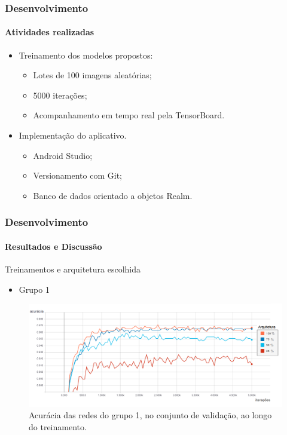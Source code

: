 \documentclass{beamer}
\begin{document}
    \begin{frame}[t]
      \frametitle{Desenvolvimento}
      \framesubtitle{Atividades realizadas}      
      \begin{itemize}
        \item<1-> Treinamento dos modelos propostos: \medskip
		 \begin{itemize}
        		\item<1-> Lotes de 100 imagens aleatórias; \medskip
        		\item<1-> 5000 iterações; \medskip
        		\item<1-> Acompanhamento em tempo real pela TensorBoard. \medskip
		\end{itemize}        
        \item<2-> Implementação do aplicativo.\medskip
        \begin{itemize}
        		\item<2-> Android Studio;\medskip
        		\item<2-> Versionamento com Git;\medskip
        		\item<2-> Banco de dados orientado a objetos Realm.\medskip
        \end{itemize}
      \end{itemize}
    \end{frame}
        
    
    \begin{frame}[t]
      \frametitle{Desenvolvimento}
      \framesubtitle{Resultados e Discussão}  \medskip  
      	Treinamentos e arquitetura escolhida \medskip    
      	\begin{itemize}
      		\item Grupo 1
		\end{itemize}      	  	
		\begin{figure}[t]
      		 \begin{minipage}[h]{1.0\linewidth}
         		\centering
      			\includegraphics[height=0.42\linewidth]{img/acc_1_5000.png}
      			\caption{Acurácia das redes do grupo 1, no conjunto de validação, ao longo do treinamento.}
      		\end{minipage}
      		\vspace{0.00mm}
      	\end{figure}	      	       
    \end{frame}
    
\end{document}
